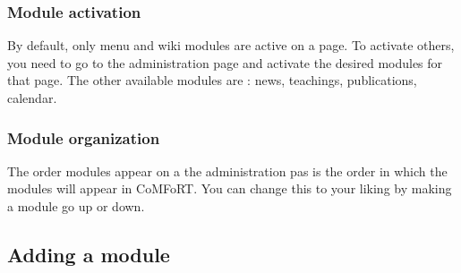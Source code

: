 \documentclass{article}
\begin{document}
    \subsubsection{Module activation}
  By default, only menu and wiki modules are active on a page. To activate others, you need to go to the administration page and activate the desired modules for that page. 
  The other available modules are : news, teachings, publications, calendar.
 \subsubsection{Module organization}
 The order modules appear on a the administration pas is the order in which the modules will appear in CoMFoRT. You can change this to your liking by making a module go up or down.
   
\subsection{Adding a module}
\end{document}
